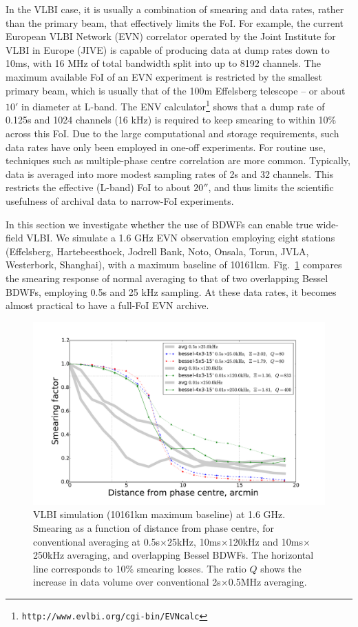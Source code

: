 \documentclass[useAMS,usenatbib]{mn2e}
\begin{document}
In the VLBI case, it is usually a combination of smearing and data rates, rather than the primary beam, 
that effectively limits the FoI. For example, the current European VLBI Network (EVN) correlator 
\citep{keipema2015sfxc} operated by the Joint Institute for VLBI in Europe (JIVE) is capable of
producing data at dump rates down to 10ms, with 16 MHz of total bandwidth split into up to 8192 channels. 
The maximum available FoI of an EVN experiment is restricted  by the smallest primary beam, which is usually 
that of the 100m Effelsberg telescope -- or about $10'$ in diameter at L-band. The ENV 
calculator\footnote{{\tt http://www.evlbi.org/cgi-bin/EVNcalc}} shows that a dump rate of 0.125s and 1024 
channels (16 kHz) is required to keep smearing to within 10\% across this FoI. Due to the large computational 
and storage requirements, such data rates have only been employed in one-off experiments. For routine use, 
techniques such as  multiple-phase centre correlation are more common. Typically, data is averaged into more modest 
sampling rates of 2s and 32 channels. This restricts the effective (L-band) FoI to about $20''$, and thus limits the scientific usefulness of archival data to narrow-FoI experiments.

In this section we investigate whether the use of BDWFs can enable true wide-field VLBI. We simulate a 1.6 GHz 
EVN observation employing eight stations (Effelsberg, Hartebeesthoek, Jodrell Bank, Noto, Onsala, Torun, JVLA, 
Westerbork, Shanghai), with a maximum baseline of 10161km. Fig.~\ref{fig:results-vlbi} compares the smearing 
response of normal averaging to that of two overlapping Bessel BDWFs, employing 0.5s and 25 kHz sampling. 
At these data rates, it becomes almost practical to have a full-FoI EVN archive. 

\begin{figure}
\includegraphics[width=.9\textwidth]{./Figures/suppression-vlbi2.pdf}
\caption{VLBI simulation (10161km maximum baseline) at 1.6 GHz. Smearing as a function of distance from 
phase centre, for conventional averaging at 0.5s$\times$25kHz, 10ms$\times$120kHz and 10ms$\times$250kHz averaging, 
and overlapping Bessel BDWFs. The horizontal line corresponds to 10\% smearing losses. The ratio $Q$ shows the 
increase in data volume over conventional 2s$\times$0.5MHz averaging.
}
\label{fig:results-vlbi}
\end{figure}
\end{document}
